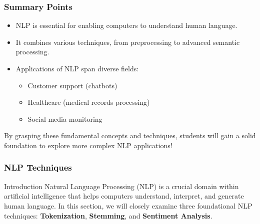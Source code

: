 \documentclass{beamer}
\begin{document}
\begin{frame}[fragile]
    \frametitle{Summary Points}
    \begin{itemize}
        \item NLP is essential for enabling computers to understand human language.
        \item It combines various techniques, from preprocessing to advanced semantic processing.
        \item Applications of NLP span diverse fields: 
        \begin{itemize}
            \item Customer support (chatbots)
            \item Healthcare (medical records processing)
            \item Social media monitoring
        \end{itemize}
    \end{itemize}
    By grasping these fundamental concepts and techniques, students will gain a solid foundation to explore more complex NLP applications!
\end{frame}

\begin{frame}
    \frametitle{NLP Techniques}
    \begin{block}{Introduction}
        Natural Language Processing (NLP) is a crucial domain within artificial intelligence that helps computers understand, interpret, and generate human language. In this section, we will closely examine three foundational NLP techniques: \textbf{Tokenization}, \textbf{Stemming}, and \textbf{Sentiment Analysis}.
    \end{block}
\end{frame}
\end{document}
